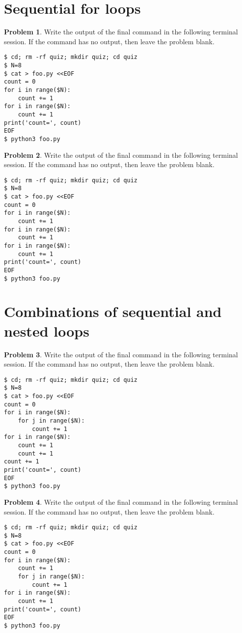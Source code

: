 \documentclass[10pt]{article}
\theoremstyle{definition}
\newtheorem{problem}{Problem}
\begin{document}
\filbreak
\section{Sequential for loops}

\begin{problem}
    Write the output of the final command in the following terminal session.
    If the command has no output, then leave the problem blank.
\end{problem}
\begin{lstlisting}
$ cd; rm -rf quiz; mkdir quiz; cd quiz
$ N=8
$ cat > foo.py <<EOF
count = 0
for i in range($N):
    count += 1
for i in range($N):
    count += 1
print('count=', count)
EOF
$ python3 foo.py
\end{lstlisting}
\vspace{0.1in}

\filbreak
\begin{problem}
    Write the output of the final command in the following terminal session.
    If the command has no output, then leave the problem blank.
\end{problem}
\begin{lstlisting}
$ cd; rm -rf quiz; mkdir quiz; cd quiz
$ N=8
$ cat > foo.py <<EOF
count = 0
for i in range($N):
    count += 1
for i in range($N):
    count += 1
for i in range($N):
    count += 1
print('count=', count)
EOF
$ python3 foo.py
\end{lstlisting}
\vspace{0.4in}

\filbreak
\section{Combinations of sequential and nested loops}

\begin{problem}
    Write the output of the final command in the following terminal session.
    If the command has no output, then leave the problem blank.
\end{problem}
\begin{lstlisting}
$ cd; rm -rf quiz; mkdir quiz; cd quiz
$ N=8
$ cat > foo.py <<EOF
count = 0
for i in range($N):
    for j in range($N):
        count += 1
for i in range($N):
    count += 1
    count += 1
count += 1
print('count=', count)
EOF
$ python3 foo.py
\end{lstlisting}
\vspace{0.4in}

\filbreak
\begin{problem}
    Write the output of the final command in the following terminal session.
    If the command has no output, then leave the problem blank.
\end{problem}
\begin{lstlisting}
$ cd; rm -rf quiz; mkdir quiz; cd quiz
$ N=8
$ cat > foo.py <<EOF
count = 0
for i in range($N):
    count += 1
    for j in range($N):
        count += 1
for i in range($N):
    count += 1
print('count=', count)
EOF
$ python3 foo.py
\end{lstlisting}
\vspace{0.4in}
\end{document}
